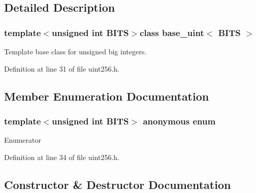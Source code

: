 \subsection{Detailed Description}
\subsubsection*{template$<$unsigned int B\+I\+T\+S$>$class base\+\_\+uint$<$ B\+I\+T\+S $>$}

Template base class for unsigned big integers. 

Definition at line 31 of file uint256.\+h.



\subsection{Member Enumeration Documentation}
\hypertarget{classbase__uint_ac5863fc3d36ac3e887fbca5e08efe046}{}\subsubsection[{anonymous enum}]{\setlength{\rightskip}{0pt plus 5cm}template$<$unsigned int B\+I\+T\+S$>$ anonymous enum\hspace{0.3cm}{\ttfamily [protected]}}\label{classbase__uint_ac5863fc3d36ac3e887fbca5e08efe046}
\begin{Desc}
\item[Enumerator]\par
\begin{description}
\item[{\em 
\hypertarget{classbase__uint_ac5863fc3d36ac3e887fbca5e08efe046adf579395d753e2d9607ecd61424f0853}{}W\+I\+D\+T\+H\label{classbase__uint_ac5863fc3d36ac3e887fbca5e08efe046adf579395d753e2d9607ecd61424f0853}
}]\end{description}
\end{Desc}


Definition at line 34 of file uint256.\+h.



\subsection{Constructor \& Destructor Documentation}
\hypertarget{classbase__uint_aafd4418923a92b58a1c360e657fa7d83}{}
